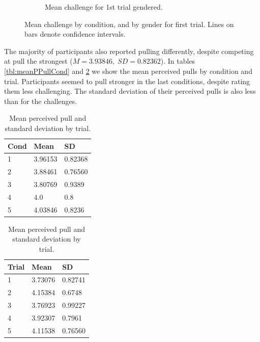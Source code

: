 \begin{figure}[H]
\begin{subfigure}[b]{0.5\textwidth}
     \caption{Mean challenge for 1st trial gendered.}
     \label{fig:meanChalGen1st}
 \end{subfigure}
     \caption{Mean challenge by condition, and by gender for first trial. Lines on bars denote confidence intervals.}
    \label{fig:Chal1st}
\end{figure}


The majority of participants also reported pulling differently, despite competing at pull the strongest ($ M=3.93846,\; SD=0.82362 $). In tables \ref{tbl:meanPPullCond} and \ref{tbl:meanPPullTrial} we show the mean perceived pulls by condition and trial. Participants seemed to pull stronger in the last conditions, despite rating them less challenging. The standard deviation of their perceived pulls is also less than for the challenges. 

\begin{table}[H]
 \captionsetup{justification=centering,margin=0.1cm}
 \begin{minipage}{.5\linewidth}
     \centering
\begin{tabular}{|lll|}
\hline
Cond & Mean & SD \\
\hline
1 &  3.96153 & 0.82368\\  
2 &  3.88461 & 0.76560\\ 
3 &  3.80769 & 0.9389\\ 
4 &  4.0 & 0.8\\  
5 & 4.03846 & 0.8236\\  
\hline
\end{tabular}
\caption{Mean perceived pull and standard deviation by condition.}
\label{tbl:meanPPullCond}
\end{minipage}\hfill
 \begin{minipage}{.5\linewidth}
 \centering
\begin{tabular}{|lll|}
\hline
Trial & Mean & SD \\
\hline
1 & 3.73076 & 0.82741\\  
2 & 4.15384 & 0.6748\\  
3 & 3.76923 &  0.99227\\  
4 & 3.92307 & 0.7961\\  
5 & 4.11538 &  0.76560\\  
\hline
\end{tabular}
\caption{Mean perceived pull and standard deviation by trial.}
\label{tbl:meanPPullTrial}
\end{minipage}
\end{table} 

